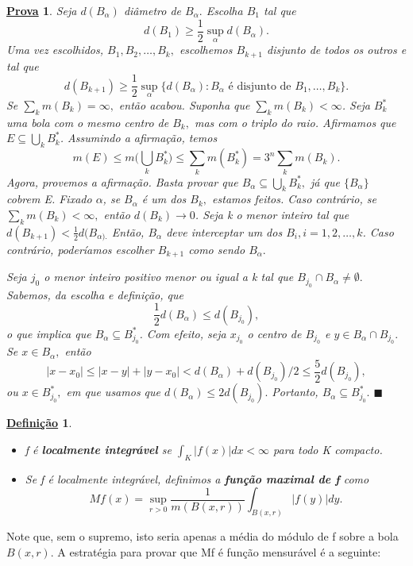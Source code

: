 \documentclass{article}
\newtheorem*{def*}{\underline{Defini\c c\~ao}}
\newtheorem*{proof*}{\underline{Prova}}
\renewcommand\qedsymbol{$\blacksquare$}
\begin{document}
 \begin{proof*}
   Seja \(d(B_{\alpha })\) diâmetro de \(B_{\alpha }.\) Escolha \(B_1\) tal que 
     \[
       d(B_{1}) \geq \frac{1}{2}\sup_{\alpha }d(B_{\alpha }).
     \]
    Uma vez escolhidos, \(B_1, B_2, \dotsc , B_{k},\) escolhemos \(B_{k+1}\) disjunto de todos os outros e tal que 
      \[
        d(B_{k+1}) \geq \frac{1}{2}\sup_{\alpha }\{d(B_{\alpha }): B_{\alpha } \text{ é disjunto de }B_1,\dotsc ,B_{k}\}.
      \]
    Se \(\sum\limits_{k}^{}m(B_{k}) = \infty,\) então acabou. Suponha que \(\sum\limits_{k}^{}m(B_{k}) < \infty\). Seja \(B_{k}^{*}\) uma bola com o mesmo centro de \(B_{k},\) mas com o triplo do raio. Afirmamos que 
  \(E\subseteq \bigcup_{k}^{}B_{k}^{*}\). Assumindo a afirmação, temos 
    \[
      m(E) \leq m \biggl(\bigcup_{k}^{}B_{k}^{*}\biggr) \leq \sum\limits_{k}^{}m(B_{k}^{*}) = 3^{n}\sum\limits_{k}^{}m(B_{k}).
    \]
    Agora, provemos a afirmação. Basta provar que \(B_{\alpha }\subseteq \bigcup_{k}^{}B_{k}^{*}, \) já que \(\{B_{\alpha }\}\) cobrem E. Fixado \(\alpha \), se \(B_{\alpha }\) é um dos \(B_{k},\) estamos feitos. Caso contrário, 
  se \(\sum\limits_{k}^{}m(B_{k}) < \infty,\) então \(d(B_{k})\to 0\). Seja k o menor inteiro tal que \(d(B_{k+1}) < \frac{1}{2}d(B_{\alpha ).}\) Então, \(B_{\alpha }\) deve interceptar um dos \(B_{i}, i = 1, 2, \dotsc, k\). Caso contrário, poderíamos escolher \(B_{k+1}\) como sendo \(B_{\alpha }.\)

    Seja \(j_{0}\) o menor inteiro positivo menor ou igual a k tal que \(B_{j_{0}}\cap B_{\alpha }\neq\emptyset.\) Sabemos, da escolha e definição, que 
      \[
        \frac{1}{2}d(B_{\alpha }) \leq d(B_{j_{0}}),
      \]
  o que implica que \(B_{\alpha }\subseteq B_{j_{0}}^{*}\). Com efeito, seja \(x_{j_{0}}\) o centro de \(B_{j_{0}}\) e \(y\in B_{\alpha }\cap B_{j_{0}}.\) Se \(x\in B_{\alpha},\) então 
    \[
      |x-x_{0}|\leq |x-y| + |y-x_{0}| < d(B_{\alpha }) + d(B_{j_{0}})/2 \leq \frac{5}{2}d(B_{j_{0}}),
    \]
  ou \(x\in B_{j_{0}}^{*},\) em que usamos que \(d(B_\alpha ) \leq 2d(B_{j_{0}}).\) Portanto, \(B_{\alpha }\subseteq B_{j_{0}}^{*}.\) \qedsymbol
 \end{proof*}
 \begin{def*}
  \begin{itemize}
    \item[1)] f é \textbf{localmente integrável} se \(\int_{K}|f(x)| dx < \infty\) para todo K compacto.
      \item[2)] Se f é localmente integrável, definimos a \textbf{função maximal de f} como
        \[
          Mf(x) = \sup_{r > 0}\frac{1}{m(B(x, r))}\int_{B(x, r)}|f(y)| dy.
        \]
  \end{itemize}
 \end{def*}
  Note que, sem o supremo, isto seria apenas a média do módulo de f sobre a bola \(B(x, r).\) A estratégia para provar que Mf é função mensurável é a seguinte: 
\end{document}
